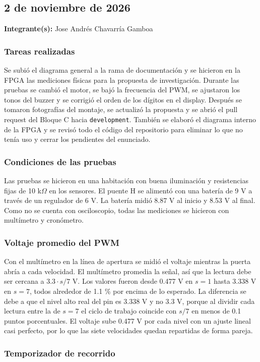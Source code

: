 \documentclass[11pt,letterpaper]{article}
\newcommand{\entrada}[2]{%
  \subsection*{#1}%
  \addcontentsline{toc}{subsection}{#1}%
  \noindent\textbf{Integrante(s):} #2\par\medskip
}
\begin{document}
\entrada{2 de noviembre de 2026}{Jose Andrés Chavarría Gamboa}

\subsubsection*{Tareas realizadas}

Se subió el diagrama general a la rama de documentación y se hicieron en la FPGA las mediciones físicas para la propuesta de investigación. Durante las pruebas se cambió el motor, se bajó la frecuencia del PWM, se ajustaron los tonos del buzzer y se corrigió el orden de los dígitos en el display. Después se tomaron fotografías del montaje, se actualizó la propuesta y se abrió el pull request del Bloque C hacia \texttt{development}. También se elaboró el diagrama interno de la FPGA y se revisó todo el código del repositorio para eliminar lo que no tenía uso y cerrar los pendientes del enunciado.

\subsubsection*{Condiciones de las pruebas}

Las pruebas se hicieron en una habitación con buena iluminación y resistencias fijas de 10 k$\Omega$ en los sensores. El puente H se alimentó con una batería de 9 V a través de un regulador de 6 V. La batería midió 8.87 V al inicio y 8.53 V al final. Como no se cuenta con osciloscopio, todas las mediciones se hicieron con multímetro y cronómetro.

\subsubsection*{Voltaje promedio del PWM}

Con el multímetro en la línea de apertura se midió el voltaje mientras la puerta abría a cada velocidad. El multímetro promedia la señal, así que la lectura debe ser cercana a $3.3 \cdot s/7$ V. Los valores fueron desde 0.477 V en $s = 1$ hasta 3.338 V en $s = 7$, todos alrededor de 1.1 \% por encima de lo esperado. La diferencia se debe a que el nivel alto real del pin es 3.338 V y no 3.3 V, porque al dividir cada lectura entre la de $s = 7$ el ciclo de trabajo coincide con $s/7$ en menos de 0.1 puntos porcentuales. El voltaje sube 0.477 V por cada nivel con un ajuste lineal casi perfecto, por lo que las siete velocidades quedan repartidas de forma pareja.

\subsubsection*{Temporizador de recorrido}
\end{document}
